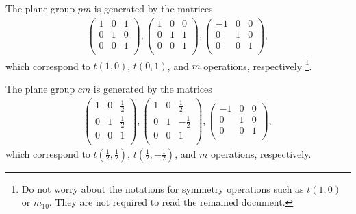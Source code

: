 
The plane group $pm$ is generated by the matrices
\begin{align*}
  \left(
    \begin{array}{cc|c}
        1 & 0 & 1 \\
        0 & 1 & 0 \\
        \hline
        0 & 0 & 1 \\
    \end{array}
  \right),
  \left(
    \begin{array}{cc|c}
        1 & 0 & 0 \\
        0 & 1 & 1 \\
        \hline
        0 & 0 & 1 \\
    \end{array}
  \right),
  \left(
    \begin{array}{cc|c}
        -1 & 0 & 0 \\
        0  & 1 & 0 \\
        \hline
        0 & 0 & 1 \\
    \end{array}
  \right),
\end{align*}
which correspond to $t(1, 0)$, $t(0, 1)$, and $m$ operations, respectively \footnote{
  Do not worry about the notations for symmetry operations such as $t(1, 0)$ or $m_{10}$.
  They are not required to read the remained document.
}.

The plane group $cm$ is generated by the matrices
\begin{align*}
  \left(
    \begin{array}{cc|c}
        1 & 0 & \frac{1}{2} \\
        0 & 1 & \frac{1}{2}\\
        \hline
        0 & 0 & 1 \\
    \end{array}
  \right),
  \left(
    \begin{array}{cc|c}
        1 & 0 & \frac{1}{2} \\
        0 & 1 & -\frac{1}{2}\\
        \hline
        0 & 0 & 1 \\
    \end{array}
  \right),
  \left(
    \begin{array}{cc|c}
        -1 & 0 & 0 \\
        0  & 1 & 0 \\
        \hline
        0 & 0 & 1 \\
    \end{array}
  \right),
\end{align*}
which correspond to $t(\frac{1}{2}, \frac{1}{2})$, $t(\frac{1}{2}, -\frac{1}{2})$, and $m$ operations, respectively.


